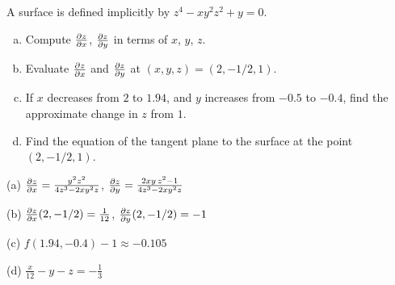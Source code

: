 \begin{question}[M200 2009D] %
A surface is defined implicitly by $z^4 - xy^2 z^2 + y = 0$.
\begin{enumerate}[(a)]
\item
Compute $\pdiff{z}{x}$, $\pdiff{z}{y}$ in terms of $x$, $y$, $z$.

\item 
Evaluate $\pdiff{z}{x}$ and $\pdiff{z}{y}$ at $(x, y, z) = (2, -1/2, 1)$.

\item
If $x$ decreases from $2$ to $1.94$, and 
   $y$ increases from $-0.5$ to $-0.4$,
find the approximate change in $z$ from $1$.

\item
Find the equation of the tangent plane to the surface at the point 
$(2, -1/2, 1)$.

\end{enumerate}
\end{question}

%

\begin{answer}
(a) $\pdiff{z}{x} = \frac{y^2 z^2}{4z^3-2xy^2z}$, 
    $\pdiff{z}{y} = \frac{2xy\, z^2-1}{4z^3-2xy^2 z}$

(b)
$
\pdiff{z}{x}(2,-1/2) =\frac{1}{12}
$,
$
\pdiff{z}{y}(2,-1/2) =-1
$

(c) $f(1.94,-0.4) - 1  \approx -0.105$

(d)  $\frac{x}{12} -y -z = -\frac{1}{3}$
\end{answer}

